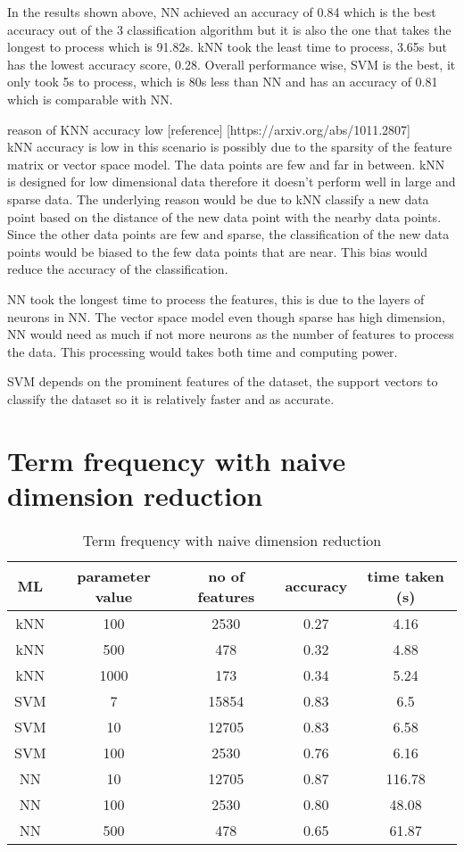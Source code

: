 In the results shown above, NN achieved an accuracy of 0.84 which is the best accuracy out of the 3 classification algorithm but it is also the one that takes the longest to process which is 91.82s. kNN took the least time to process, 3.65s but has the lowest accuracy score, 0.28. Overall performance wise, SVM is the best, it only took 5s to process, which is 80s less than NN and has an accuracy of 0.81 which is comparable with NN. 

reason of KNN accuracy low [reference] [https://arxiv.org/abs/1011.2807]\\
kNN accuracy is low in this scenario is possibly due to the sparsity of the feature matrix or vector space model. The data points are few and far in between. kNN is designed for low dimensional data therefore it doesn't perform well in large and sparse data. The underlying reason would be due to kNN classify a new data point based on the distance of the new data point with the nearby data points. Since the other data points are few and sparse, the classification of the new data points would be biased to the few data points that are near. This bias would reduce the accuracy of the classification.

NN took the longest time to process the features, this is due to the layers of neurons in NN. The vector space model even though sparse has high dimension, NN would need as much if not more neurons as the number of features to process the data. This processing would takes both time and computing power.

SVM depends on the prominent features of the dataset, the support vectors to classify the dataset so it is relatively faster and as accurate.

\clearpage
\section{Term frequency with naive dimension reduction}

\begin{table} [ht]
	\centering
	\begin{tabular}{|| c | c | c | c | c||}
		\hline
		ML & parameter value & no of features & accuracy & time taken (s) \\ [0.5ex]
		\hline\hline
		kNN & 100 & 2530 & 0.27 & 4.16 \\ 
		\hline
		kNN & 500 & 478 & 0.32 & 4.88 \\ 
		\hline
		kNN & 1000 & 173 & 0.34 & 5.24 \\ 
		\hline\hline
		SVM & 7 & 15854 & 0.83 & 6.5 \\
		\hline
		SVM & 10 & 12705 & 0.83 & 6.58 \\
		\hline
		SVM & 100 & 2530 & 0.76 & 6.16 \\
		\hline\hline
		NN & 10 & 12705 & 0.87 & 116.78 \\
		\hline
		NN & 100 & 2530 & 0.80 & 48.08 \\
		\hline
		NN & 500 & 478 & 0.65 & 61.87 \\
		\hline\hline
	\end{tabular}
\caption{Term frequency with naive dimension reduction}
\label{tbl:termFrequencyNaive}
\end{table}


